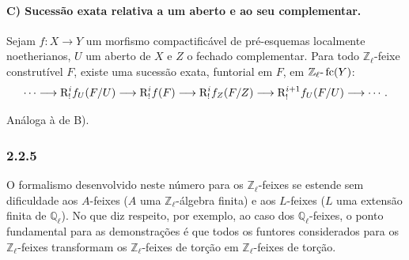 \paragraph{C) Sucessão exata relativa a um aberto e ao seu complementar.}
Sejam \(f:X\to Y\) um morfismo compactificável de pré-esquemas localmente noetherianos, \(U\) um aberto de \(X\) e \(Z\) o fechado complementar. Para todo \(\mathbb Z_\ell\)-feixe construtível \(F\), existe uma sucessão exata, funtorial em \(F\), em \(\mathbb Z_\ell\text{-}\operatorname{fc}(Y)\):
\[
\cdots\longrightarrow \mathrm{R}^i_!f_U(F/U)
\longrightarrow \mathrm{R}^i_!f(F)
\longrightarrow \mathrm{R}^i_!f_Z(F/Z)
\longrightarrow \mathrm{R}^{i+1}_!f_U(F/U)
\longrightarrow\cdots .
\]

\begin{prooftext}[Demonstração]
Análoga à de B).
\end{prooftext}

\subsubsection*{2.2.5}
O formalismo desenvolvido neste número para os \(\mathbb Z_\ell\)-feixes se estende sem dificuldade aos \(A\)-feixes (\(A\) uma \(\mathbb Z_\ell\)-álgebra finita) e aos \(L\)-feixes (\(L\) uma extensão finita de \(\mathbb Q_\ell\)). No que diz respeito, por exemplo, ao caso dos \(\mathbb Q_\ell\)-feixes, o ponto fundamental para as demonstrações é que todos os funtores considerados para os \(\mathbb Z_\ell\)-feixes transformam os \(\mathbb Z_\ell\)-feixes de torção em \(\mathbb Z_\ell\)-feixes de torção.
